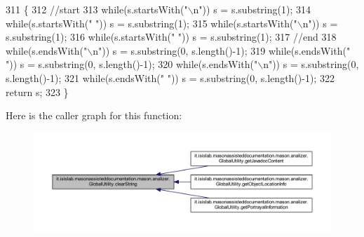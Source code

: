 \begin{DoxyCode}
311                                               \{
312         \textcolor{comment}{//start}
313         \textcolor{keywordflow}{while}(s.startsWith(\textcolor{stringliteral}{"\(\backslash\)n"}))   s = s.substring(1);
314         \textcolor{keywordflow}{while}(s.startsWith(\textcolor{stringliteral}{" "}))    s = s.substring(1);
315         \textcolor{keywordflow}{while}(s.startsWith(\textcolor{stringliteral}{"\(\backslash\)n"}))   s = s.substring(1);
316         \textcolor{keywordflow}{while}(s.startsWith(\textcolor{stringliteral}{" "}))    s = s.substring(1);
317         \textcolor{comment}{//end}
318         \textcolor{keywordflow}{while}(s.endsWith(\textcolor{stringliteral}{"\(\backslash\)n"})) s = s.substring(0, s.length()-1);
319         \textcolor{keywordflow}{while}(s.endsWith(\textcolor{stringliteral}{" "}))  s = s.substring(0, s.length()-1);
320         \textcolor{keywordflow}{while}(s.endsWith(\textcolor{stringliteral}{"\(\backslash\)n"})) s = s.substring(0, s.length()-1);
321         \textcolor{keywordflow}{while}(s.endsWith(\textcolor{stringliteral}{" "}))  s = s.substring(0, s.length()-1);
322         \textcolor{keywordflow}{return} s;
323     \}
\end{DoxyCode}


Here is the caller graph for this function\-:\nopagebreak
\begin{figure}[H]
\begin{center}
\leavevmode
\includegraphics[width=350pt]{classit_1_1isislab_1_1masonassisteddocumentation_1_1mason_1_1analizer_1_1_global_utility_a56635a5ae634c04b2a8ae186bb1cada8_icgraph}
\end{center}
\end{figure}


